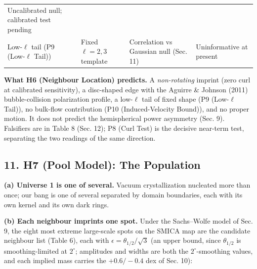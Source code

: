 \documentclass[
  11pt,
]{article}
\begin{document}
\begin{longtable}[]{@{}llll@{}}
\begin{minipage}[t]{0.22\columnwidth}
Uncalibrated null; calibrated test pending\strut
\end{minipage}\tabularnewline
\begin{minipage}[t]{0.22\columnwidth}\raggedright
Low-\(\ell\) tail (P9 (Low-\(\ell\) Tail))\strut
\end{minipage} & \begin{minipage}[t]{0.22\columnwidth}\raggedright
Fixed \(\ell=2,3\) template\strut
\end{minipage} & \begin{minipage}[t]{0.22\columnwidth}\raggedright
Correlation vs Gaussian null (Sec. 11)\strut
\end{minipage} & \begin{minipage}[t]{0.22\columnwidth}\raggedright
Uninformative at present\strut
\end{minipage}\tabularnewline
\bottomrule
\end{longtable}

\textbf{What H6 (Neighbour Location) predicts.} A \emph{non-rotating}
imprint (zero curl at calibrated sensitivity), a disc-shaped edge with
the Aguirre \& Johnson (2011) bubble-collision polarization profile, a
low-\(\ell\) tail of fixed shape (P9 (Low-\(\ell\) Tail)), no bulk-flow
contribution (P10 (Induced-Velocity Bound)), and no proper motion. It
does not predict the hemispherical power asymmetry (Sec. 9). Falsifiers
are in Table 8 (Sec. 12); P8 (Curl Test) is the decisive near-term test,
separating the two readings of the same direction.

\hypertarget{h7-pool-model-the-population}{%
\subsection{\texorpdfstring{\textbf{11. H7 (Pool Model): The
Population}}{11. H7 (Pool Model): The Population}}\label{h7-pool-model-the-population}}

\textbf{(a) Universe 1 is one of several.} Vacuum crystallization
nucleated more than once; our bang is one of several separated by domain
boundaries, each with its own kernel and its own dark rings.

\textbf{(b) Each neighbour imprints one spot.} Under the Sachs--Wolfe
model of Sec. 9, the eight most extreme large-scale spots on the SMICA
map are the candidate neighbour list (Table 6), each with
\(\epsilon = \theta_{1/2}/\sqrt{3}\) (an upper bound, since
\(\theta_{1/2}\) is smoothing-limited at \(2^\circ\); amplitudes and
widths are both the \(2^\circ\)-smoothing values, and each implied mass
carries the \(+0.6/-0.4\) dex of Sec. 10):
\end{document}
